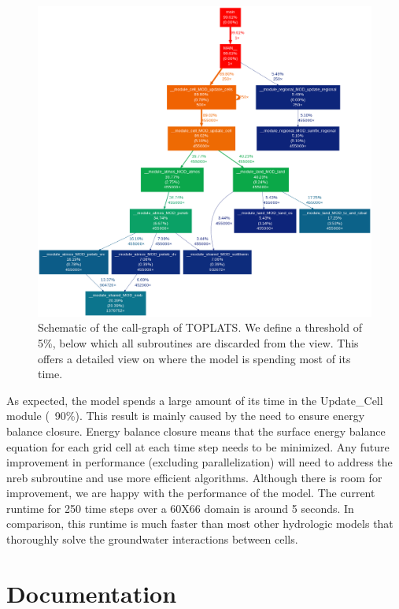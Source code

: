 \documentclass[pdftex,12pt,a4paper]{article}
\begin{document}
\begin{figure}[h]
	\includegraphics[width=5.0in]{Figures/CallGraph.png}

	\caption{Schematic of the call-graph of TOPLATS. We define a threshold of 5\%, below which all subroutines are discarded from the view. This offers a detailed view on where the model is spending most of its time.}
	\label{Profiling1}
\end{figure}

\vspace{1em}

As expected, the model spends a large amount of its time in the Update\_Cell module (~90\%). This result is mainly caused by the need to ensure energy balance closure. Energy balance closure means that the surface energy balance equation for each grid cell at each time step needs to be minimized. Any future improvement in performance (excluding parallelization) will need to address the nreb subroutine and use more efficient algorithms. Although there is room for improvement, we are happy with the performance of the model. The current runtime for 250 time steps over a 60X66 domain is around 5 seconds. In comparison, this runtime is much faster than most other hydrologic models that thoroughly solve the groundwater interactions between cells.

\newpage
\section{Documentation}
\end{document}
